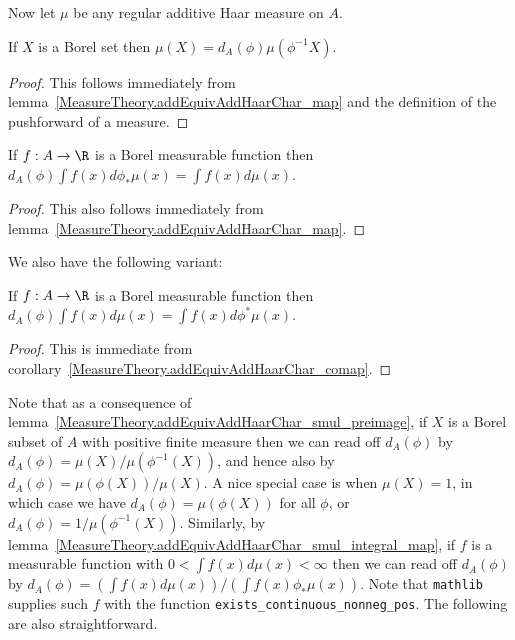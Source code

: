 Now let $\mu$ be any regular additive Haar measure on $A$.

\begin{lemma}
  \label{MeasureTheory.addEquivAddHaarChar_smul_preimage}
  \leanok
  If $X$ is a Borel set then $\mu(X)=d_A(\phi)\mu(\phi^{-1}X)$.
\end{lemma}
\begin{proof}
  \leanok
  This follows immediately from lemma~\ref{MeasureTheory.addEquivAddHaarChar_map}
  and the definition of the pushforward of a measure.
\end{proof}

\begin{lemma}
  \label{MeasureTheory.addEquivAddHaarChar_smul_integral_map}
  \leanok
  If $f:A\to\R$ is a Borel measurable function then
  $d_A(\phi)\int f(x)d\phi_*\mu(x)=\int f(x)d\mu(x)$.
\end{lemma}
\begin{proof}
  \leanok
  This also follows immediately from lemma~\ref{MeasureTheory.addEquivAddHaarChar_map}.
\end{proof}

We also have the following variant:

\begin{lemma}
  \label{MeasureTheory.addEquivAddHaarChar_smul_integral_comap}
  \leanok
  If $f:A\to\R$ is a Borel measurable function then
  $d_A(\phi)\int f(x)d\mu(x)=\int f(x)d\phi^*\mu(x)$.
\end{lemma}
\begin{proof}
  \leanok
  This is immediate from corollary~\ref{MeasureTheory.addEquivAddHaarChar_comap}.
\end{proof}

Note that as a consequence of lemma~\ref{MeasureTheory.addEquivAddHaarChar_smul_preimage},
if $X$ is a Borel subset of $A$ with positive finite measure then we can read
off $d_A(\phi)$ by $d_A(\phi)=\mu(X)/\mu(\phi^{-1}(X))$, and hence also by
$d_A(\phi)=\mu(\phi(X))/\mu(X)$. A nice special case is when
$\mu(X)=1$, in which case we have $d_A(\phi)=\mu(\phi(X))$ for all $\phi$,
or $d_A(\phi)=1/\mu(\phi^{-1}(X))$.
Similarly, by lemma~\ref{MeasureTheory.addEquivAddHaarChar_smul_integral_map},
if $f$ is a measurable function with $0<\int f(x)d\mu(x)<\infty$ then
we can read off $d_A(\phi)$ by $d_A(\phi)=(\int f(x)d\mu(x))/(\int f(x)\phi_*\mu(x))$.
Note that {\tt mathlib} supplies such $f$ with the function {\tt exists\_continuous\_nonneg\_pos}.
The following are also straightforward.

